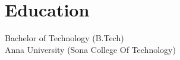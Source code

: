 \section*{Education}

Bachelor of Technology (B.Tech) \\
Anna University (Sona College Of Technology)
